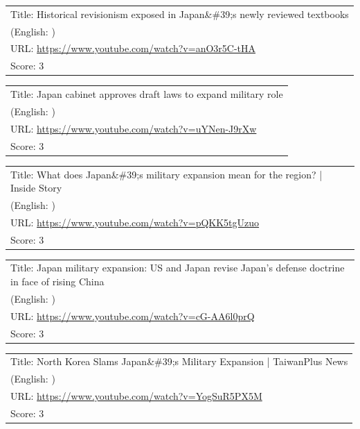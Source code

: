 \documentclass{article}
\begin{document}
\noindent
\begin{tabular}{p{}}
Title: Historical revisionism exposed in Japan\&\#39;s newly reviewed textbooks \\
(English: ) \\
URL: \url{https://www.youtube.com/watch?v=anO3r5C-tHA} \\
Score: 3 \\
\end{tabular}
\vspace{0.5em}

\noindent
\begin{tabular}{p{}}
Title: Japan cabinet approves draft laws to expand military role \\
(English: ) \\
URL: \url{https://www.youtube.com/watch?v=uYNen-J9rXw} \\
Score: 3 \\
\end{tabular}
\vspace{0.5em}

\noindent
\begin{tabular}{p{}}
Title: What does Japan\&\#39;s military expansion mean for the region? | Inside Story \\
(English: ) \\
URL: \url{https://www.youtube.com/watch?v=pQKK5tgUzuo} \\
Score: 3 \\
\end{tabular}
\vspace{0.5em}

\noindent
\begin{tabular}{p{}}
Title: Japan military expansion: US and Japan revise Japan’s defense doctrine in face of rising China \\
(English: ) \\
URL: \url{https://www.youtube.com/watch?v=cG-AA6l0prQ} \\
Score: 3 \\
\end{tabular}
\vspace{0.5em}

\noindent
\begin{tabular}{p{}}
Title: North Korea Slams Japan\&\#39;s Military Expansion | TaiwanPlus News \\
(English: ) \\
URL: \url{https://www.youtube.com/watch?v=YogSuR5PX5M} \\
Score: 3 \\
\end{tabular}
\vspace{0.5em}
\end{document}
